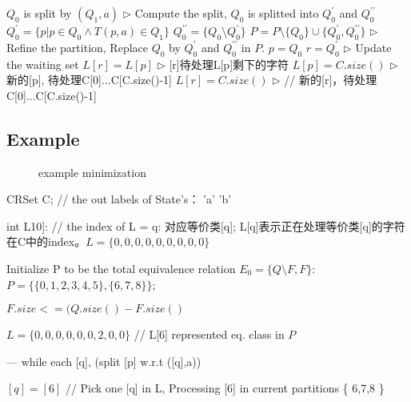 \begin{algorithm}
\begin{algorithmic}[1]
				\State $Q_0$ is split by $(Q_1,a)$  \qquad\qquad $\triangleright$ Compute the split, $Q_0$ is splitted into $Q_0^\prime$ and $Q_0^{\prime\prime}$
				\State $Q_0^{\prime}=\{p|p\in Q_0\land T(p,a)\in Q_1\}$ 
				\State $Q_0^{\prime\prime}=\{Q_0\setminus Q_0^\prime\}$
				\State $P=P\setminus \{Q_0\}\cup\{Q_0^\prime, Q_0^{\prime\prime}\}$ \qquad\qquad $\triangleright$ Refine the partition, Replace $Q_0$ by $Q_0^\prime$ and $Q_0^{\prime\prime}$ in $P$.
				\State $p=Q_0$
				\State $r=Q_0^\prime$
				  \qquad\qquad $\triangleright$ Update the waiting set
					\If {($ [p]\le |[r]|$)}
					\State $L[r]=L[p] $ \qquad\qquad $\triangleright$  [r]待处理L[p]剩下的字符
					\State $L[p]=C.size()$  \qquad\qquad $\triangleright$  新的[p], 待处理C[0]...C[C.size()-1]
					\Else
					\State $L[r]=C.size() $ \qquad\qquad $\triangleright$ // 新的[r]，待处理C[0]...C[C.size()-1]
					\EndIf  
				\EndIf 
			\EndFor
		\EndWhile
	\end{algorithmic}
\end{algorithm}

\subsection{Example}

\begin{figure} \centering 
	\caption{ example minimization } 
	\label{fig:mini-ex} 
\end{figure}



CRSet C;  // the out labels of State's：{ 'a'  'b' } 

int L10]: // the index of L = q: 对应等价类[q]; L[q]表示正在处理等价类[q]的字符在C中的index。$L = \{ 0,0,0,0,0,0,0,0,0 \} $

Initialize P to be the total equivalence relation $E_0=\{Q\setminus F, F\}$: $P = \{ \{ 0,1,2,3,4,5 \}, \{6,7,8 \} \}$;

$F.size <= (Q.size() - F.size()$

$L = \{ 0,0,0,0,0,0,2,0,0 \} $ // L[6] represented eq. class in $P$


--- while each [q], (split [p] w.r.t ([q],a))

$[q] = [6]$ // Pick one [q] in L, Processing [6] in current partitions \{ 6,7,8 \}

